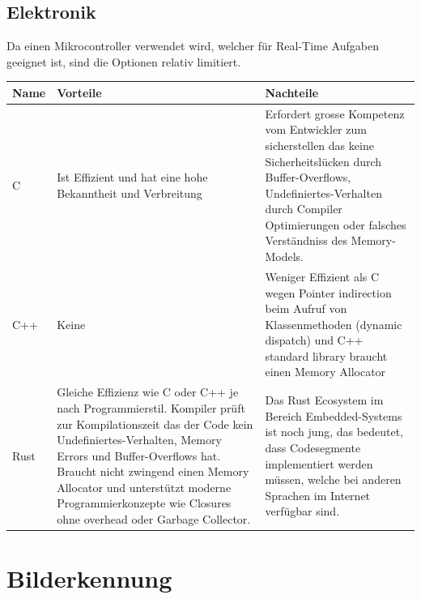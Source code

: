 \documentclass[a4paper]{report}
\begin{document}
\subsection{Elektronik}
Da einen Mikrocontroller verwendet wird, welcher für Real-Time Aufgaben
geeignet ist, sind die Optionen relativ limitiert.

\vspace{1em}
\noindent
\begin{tabular}{|p{}|p{}|p{}|}
  \hline
  \textbf{Name} & \textbf{Vorteile} & \textbf{Nachteile} \\
  \hline
  C & Ist Effizient und hat eine hohe Bekanntheit und Verbreitung & Erfordert grosse Kompetenz vom Entwickler zum sicherstellen das keine Sicherheitslücken durch Buffer-Overflows, Undefiniertes-Verhalten durch Compiler Optimierungen oder falsches Verständniss des Memory-Models. \\
  \hline
  C++ & Keine & Weniger Effizient als C wegen Pointer indirection beim Aufruf von Klassenmethoden (dynamic dispatch) und C++ standard library braucht einen Memory Allocator \\
  \hline
  Rust & Gleiche Effizienz wie C oder C++ je nach Programmierstil. Kompiler prüft zur Kompilationszeit das der Code kein Undefiniertes-Verhalten, Memory Errors und Buffer-Overflows hat. Braucht nicht zwingend einen Memory Allocator und unterstützt moderne Programmierkonzepte wie Closures ohne overhead oder Garbage Collector. & Das Rust Ecosystem im Bereich Embedded-Systems ist noch jung, das bedeutet, dass Codesegmente implementiert werden müssen, welche bei anderen Sprachen im Internet verfügbar sind.\\
  \hline
\end{tabular}

\section{Bilderkennung}
\end{document}
